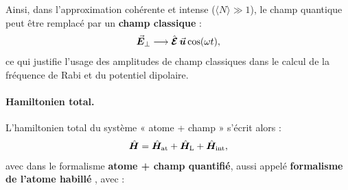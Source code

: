 Ainsi, dans l’approximation cohérente et intense (\(\langle N \rangle \gg 1\)), le champ quantique peut être remplacé par un {\bf champ classique}  :
\begin{equation}
	\vec{{\bm{E}}}_\perp \longrightarrow  \hat{\bm{\mathcal{E}}} \, \vec{{\bm{u}}} \cos(\omega t),
\end{equation}
ce qui justifie l’usage des amplitudes de champ classiques dans le calcul de la fréquence de Rabi et du potentiel dipolaire.

\medskip

\paragraph{Hamiltonien total.}
L’hamiltonien total du système « atome + champ » s’écrit alors \cite{??} :
\begin{eqnarray}
\hat{\bm{H}} = \hat{\bm{H}}_{\mathrm{at}} + \hat{\bm{H}}_{\mathrm{L}} + \hat{\bm{H}}_{\mathrm{int}},	
\end{eqnarray}
avec 
dans le formalisme {\bf atome + champ quantifié}, aussi appelé {\bf formalisme de l’atome habillé} , avec :

